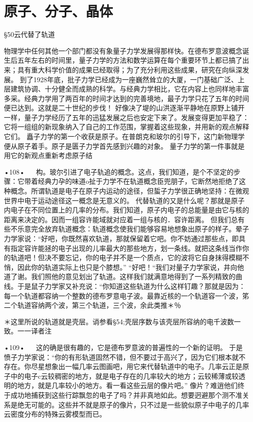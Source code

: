 \chapter{原子、分子、晶体}

§50云代替了轨道

物理学中任何其他一个部门都没有象量子力学发展得那样快。在德布罗意波概念诞生后五年左右的时间里，量子力学的方法和数学运算在每个重要环节上都已搞了出来；具有重大科学价值的成果已经取得；为了充分利用这些成果，研究在向纵深发展。
到了1928年底，批子力学已经成为一座巍然耸立的大厦，一门基础广泛、上层建筑协调、十分健全而成熟的科学。与经典力学相比，它在内容上也同样地丰富多采。经典力学用了两百年的时间才达到的完善境地，最子力学只花了五年的时间便已达到。这就是二十世纪的步伐！
好像决了堤的山洪逐渐平静地在原野上铺开一样，量子力学经历了五年的迅猛发展之后也安定下来了。发展变得更加平稳了：它将一组组的新现象纳入了自己的工作范围，掌握着这些现象，并用新的观点解释它们。
矗子力学的第一个收获是原子。在普朗克和玻尔的引导下，这门新物理学便从原子着手。原子是匮子力学首先感到兴趣的对象。
量子力学的第一件事就是用它的新观点重新考虑原子结

•108•
  
构。玻尔引进了电子轨追的概念。这点，我们知道，是个不坚定的步骤：它带着经典力孕的味道o扯于力学不在轨道概念臣兜朋子，它断然地拒绝了这种概念。所谓轨道是电子在原子内运动的途径，但蜇子力学很正确地坚持：在微观世界中电于运动途径这一概念是无意义的。
代替轨道的又是什么呢？那就是原子内电子在不同位置上的几率的分布。我们知道，原子内电子的总能量是由它与核的距离来决定的。因而一组容许能域就对应着一组与核的．容许距离。
但我们总有些不乐意完全放弃轨道概念：轨道概念使我们能够容易地想象出原子的样子。晕子力学家说：“好吧，你既然喜欢轨道，那就保留着它吧。你不妨通过那些点，即具有指定容许能拯的电子出现的儿率最大的那些地方，划一条线。就把这条线当作你的轨道吧！但决不要忘记，你的电子并不是一个质点，它的波将它自身抹得模糊不悄，因此你的轨道实际上也只是个膝想。”
“好吧！“我们对量子力学家说，井向他道了谢。我们照他的意见划出了轨道。这样我们就满意地得到了一系列精致的曲线。于是鼠子力学家又补充说：“你知道这些轨道为什么这样钉趣？那就是因为：每一个轨道都容纳一个整数的德布罗意电子波。最靠近核的一个轨道容一个波，笫二个轨道容纳两个波，第三个轨道，三个波，余此类推＊％

＊这里所说的轨道就是壳层。诮参看§54;壳层序数与该壳层所容纳的电千波数一致。一一译者注

•109•
  
这的确是很有趣的，它是德布罗意波的普遍性的一个新的证明。
于是愤子力学家说：“你的有形轨道固然不错，但不要过于高兴了，因为它们根本就不存在。你尽星想象出一幅几率云图画吧，用它来代替轨道中的电子。几率云正是原子中的电子c云较稠密的地方，就是电子存在的几率较大的地方；云较稀薄或较透明的地方，就是几率较小的地方。看一看这些云层的像片吧。”
像片？难逍他们终于成功地捕获到这些行踪飘忽的电子了吗？并非真地如此。想要迥避那个测不准关系是绝无可能的。这些并不就是原子的像片，只不过是一些貌似原子中电子的几率云密度分布的特殊云雾模型而已。

